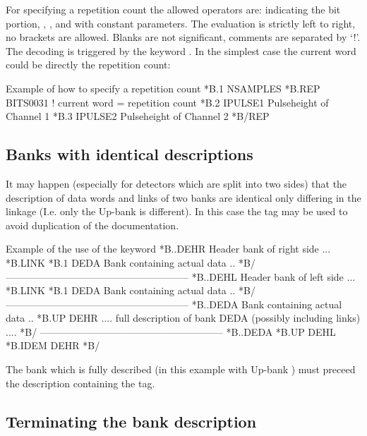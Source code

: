  
For specifying a repetition count the allowed operators are:
 indicating the bit portion, \Lit{+}, \Lit{-}, \Lit{/} and
\Lit{*} with constant parameters.
The evaluation is strictly left to right, no brackets are allowed.
Blanks are not significant, comments are separated by `!'.
The decoding is triggered by the keyword .
In the simplest case the current word could be directly the repetition
count:
 
\begin{XMPt}{Example of how to specify a repetition count}
*B.1     NSAMPLES
*B.REP   BITS0031      ! current word = repetition count
*B.2     IPULSE1        Pulseheight of Channel 1
*B.3     IPULSE2        Pulseheight of Channel 2
*B/REP
\end{XMPt}
 
\subsection{Banks with identical descriptions}
 
It may happen (especially for detectors which are split into two
sides) that the description of data words and links of two banks are
identical only differing in the linkage 
(I.e. only the Up-bank is different).
In this case the tag  may be used to avoid
duplication of the documentation.
 
\begin{XMPt}{Example of the use of the  keyword}
  *B..DEHR   Header bank of right side
  ...
  *B.LINK
  *B.1    DEDA   Bank containing actual data
  ..
  *B/
  --------------------------------------------------------
  *B..DEHL   Header bank of left side
  ...
  *B.LINK
  *B.1    DEDA   Bank containing actual data
  ..
  *B/
  --------------------------------------------------------
  *B..DEDA  Bank containing actual data
  ..
  *B.UP    DEHR
  ....
  full description of bank DEDA (possibly including links)
  ....
  *B/
  --------------------------------------------------------
  *B..DEDA
  *B.UP      DEHL
  *B.IDEM    DEHR
  *B/
\end{XMPt}
 
The bank which is fully described (in this example  with
Up-bank ) must preceed the description containing the 
 tag.
 
 
\subsection{Terminating the bank description}
 
